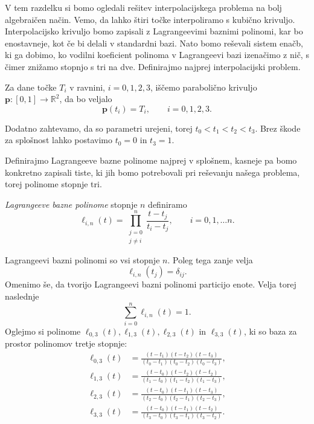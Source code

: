 \documentclass[mat1]{fmfdelo}
\newcommand{\R}{\mathbb R}
\begin{document}
V tem razdelku si bomo ogledali rešitev interpolacijskega problema na bolj algebraičen način. Vemo, da lahko štiri točke interpoliramo s kubično krivuljo. Interpolacijsko krivuljo bomo zapisali z Lagrangeevimi baznimi polinomi, kar bo enostavneje, kot če bi delali v standardni bazi. Nato bomo reševali sistem enačb, ki ga dobimo, ko vodilni koeficient polinoma v Lagrangeevi bazi izenačimo z nič, s čimer znižamo stopnjo s tri na dve. Definirajmo najprej interpolacijski problem.

Za dane točke $T_i$ v ravnini, $i = 0, 1, 2, 3$, iščemo parabolično krivuljo $\textbf{p} : [ 0, 1 ] \rightarrow \R^2$, da bo veljalo $$\textbf{p}(t_i) = T_i, \qquad i = 0, 1, 2, 3.$$ 

Dodatno zahtevamo, da so parametri urejeni, torej $t_0 < t_1 < t_2 < t_3$. Brez škode za splošnost lahko postavimo $t_0 = 0$ in $t_3 = 1$.

Definirajmo Lagrangeeve bazne polinome najprej v splošnem, kasneje pa bomo konkretno zapisali tiste, ki jih bomo potrebovali pri reševanju našega problema, torej polinome stopnje tri.

\begin{definicija}
\emph{Lagrangeeve bazne polinome} stopnje $n$ definiramo
%
$$ \ell_{i,n}(t) = \prod_{\substack{j=0 \\ j \neq i}}^{n} \frac{t - t_j}{t_i - t_j} , \qquad i = 0, 1, \ldots n.$$	
\end{definicija}
%
Lagrangeevi bazni polinomi so vsi stopnje $n$. Poleg tega zanje velja $$\ell_{i,n}(t_j) = \delta_{ij}.$$
Omenimo še, da tvorijo Lagrangeevi bazni polinomi particijo enote. Velja torej naslednje
%
\begin{equation*}
\sum_{i = 0}^{n} \ell_{i,n}(t) = 1.
\end{equation*}
%
Oglejmo si polinome $ \ell_{0,3}(t), \ell_{1,3}(t), \ell_{2,3}(t)$ in $ \ell_{3,3}(t) $, ki so baza za prostor polinomov tretje stopnje:
%
\begin{align*}
	\ell_{0,3}(t) &= \frac{(t - t_1)(t - t_2)(t - t_3)}{(t_0 - t_1)(t_0 - t_2)(t_0 - t_3)}, \\
	\ell_{1,3}(t) &= \frac{(t - t_0)(t - t_2)(t - t_2)}{(t_1 - t_0)(t_1 - t_2)(t_1 - t_3)}, \\
	\ell_{2,3}(t) &= \frac{(t - t_0)(t - t_1)(t - t_3)}{(t_2 - t_0)(t_2 - t_1)(t_2 - t_3)}, \\
	\ell_{3,3}(t) &= \frac{(t - t_0)(t - t_1)(t - t_2)}{(t_3 - t_0)(t_3 - t_1)(t_3 - t_2)}. 	
\end{align*}
\end{document}

